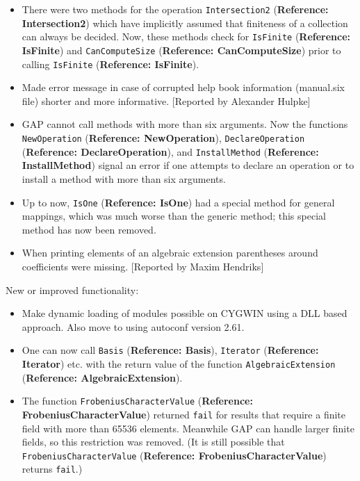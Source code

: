\documentclass[a4paper,11pt]{report}
\begin{document}
{{\begin{itemize}
approach, but did not reliably trigger the second step. This has now been
fixed, preventing a slow infinite loop repeating the first step. This was
normally only seen as part of a larger calculation. 
\item  There were two methods for the operation \texttt{Intersection2} (\textbf{Reference: Intersection2}) which have implicitly assumed that finiteness of a collection can always be
decided. Now, these methods check for \texttt{IsFinite} (\textbf{Reference: IsFinite}) and \texttt{CanComputeSize} (\textbf{Reference: CanComputeSize}) prior to calling \texttt{IsFinite} (\textbf{Reference: IsFinite}). 
\item  Made error message in case of corrupted help book information (manual.six
file) shorter and more informative. [Reported by Alexander Hulpke] 
\item  \textsf{GAP} cannot call methods with more than six arguments. Now the functions \texttt{NewOperation} (\textbf{Reference: NewOperation}), \texttt{DeclareOperation} (\textbf{Reference: DeclareOperation}), and \texttt{InstallMethod} (\textbf{Reference: InstallMethod}) signal an error if one attempts to declare an operation or to install a method
with more than six arguments. 
\item  Up to now, \texttt{IsOne} (\textbf{Reference: IsOne}) had a special method for general mappings, which was much worse than the
generic method; this special method has now been removed. 
\item  When printing elements of an algebraic extension parentheses around
coefficients were missing. [Reported by Maxim Hendriks] 
\end{itemize}
 New or improved functionality: 
\begin{itemize}
\item  Make dynamic loading of modules possible on CYGWIN using a DLL based approach.
Also move to using autoconf version 2.61. 
\item  One can now call \texttt{Basis} (\textbf{Reference: Basis}), \texttt{Iterator} (\textbf{Reference: Iterator}) etc. with the return value of the function \texttt{AlgebraicExtension} (\textbf{Reference: AlgebraicExtension}). 
\item  The function \texttt{FrobeniusCharacterValue} (\textbf{Reference: FrobeniusCharacterValue}) returned \texttt{fail} for results that require a finite field with more than 65536 elements.
Meanwhile \textsf{GAP} can handle larger finite fields, so this restriction was removed. (It is still
possible that \texttt{FrobeniusCharacterValue} (\textbf{Reference: FrobeniusCharacterValue}) returns \texttt{fail}.) 

\end{itemize}}}
\end{document}
